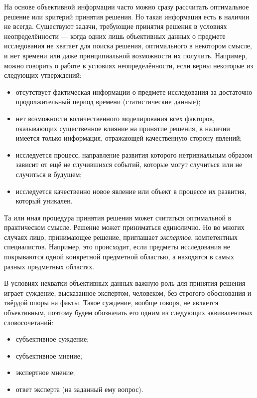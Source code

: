 На основе объективной информации часто можно сразу рассчитать оптимальное решение или критерий принятия решения. Но такая информация есть в наличии не всегда. Существуют задачи, требующие принятия решения в условиях неопределённости --- когда одних лишь объективных данных о предмете исследования не хватает для поиска решения, оптимального в некотором смысле, и нет времени или даже принципиальной возможности их  получить. Например, можно говорить о работе в условиях неопределённости, если верны некоторые из следующих утверждений:
\begin{itemize}
 \item отсутствует фактическая информации о предмете исследования за достаточно продолжительный период времени (статистические данные);
 \item нет возможности количественного моделирования всех факторов, оказывающих существенное влияние на принятие решения, в наличии имеется только информация, отражающей качественную сторону явлений; 
 \item исследуется процесс, направление развития которого нетривиальным образом зависит от ещё не случившихся событий, которые могут случиться или не случиться в будущем;
 \item исследуется качественно новое явление или объект в процессе их развития, который уникален.
\end{itemize}

Та или иная процедура принятия решения может считаться оптимальной в практическом смысле. Решение может приниматься единолично. Но во многих случаях лицо, принимающее решение, приглашает {\sl экспертов}, компетентных специалистов. Например, это происходит,  если предметы исследования не покрываются одной конкретной предметной областью, а находятся в самых разных предметных областях. 

В условиях нехватки объективных данных важную роль для принятия решения играет суждение, высказанное экспертом, человеком, без строгого обоснования и твёрдой опоры на факты. Такое суждение, вообще говоря, не является объективным, поэтому будем обозначать его одним из следующих эквивалентных словосочетаний:
 \begin{itemize}
	\item субъективное суждение;
	\item субъективное мнение;
	\item экспертное мнение;
	\item ответ эксперта (на заданный ему вопрос). 
 \end{itemize}


